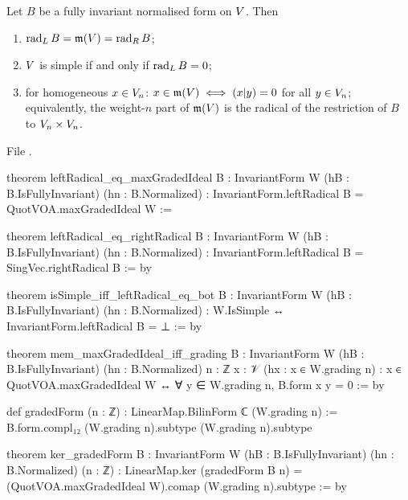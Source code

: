 \begin{theorem}[Li, Cor.~3.2]\label{l04:thm:lirad}
Let $B$ be a fully invariant normalised form on $V$. Then
\begin{enumerate}
\item $\operatorname{rad}_LB = \mathfrak{m}(V) = \operatorname{rad}_RB$;
\item $V$ is simple if and only if $\operatorname{rad}_LB = 0$;
\item for homogeneous $x\in V_n$: $x\in\mathfrak{m}(V)\iff(x|y) = 0$ for all $y\in V_n$; equivalently, the
weight-$n$ part of $\mathfrak{m}(V)$ is the radical of the restriction of $B$ to $V_n\times V_n$.
\end{enumerate}
\end{theorem}
\noindent File .
\begin{leancode}
theorem leftRadical_eq_maxGradedIdeal {B : InvariantForm W} (hB : B.IsFullyInvariant)
    (hn : B.Normalized) :
    InvariantForm.leftRadical B = QuotVOA.maxGradedIdeal W :=

theorem leftRadical_eq_rightRadical {B : InvariantForm W} (hB : B.IsFullyInvariant)
    (hn : B.Normalized) :
    InvariantForm.leftRadical B = SingVec.rightRadical B := by

theorem isSimple_iff_leftRadical_eq_bot {B : InvariantForm W} (hB : B.IsFullyInvariant)
    (hn : B.Normalized) :
    W.IsSimple ↔ InvariantForm.leftRadical B = ⊥ := by

theorem mem_maxGradedIdeal_iff_grading {B : InvariantForm W} (hB : B.IsFullyInvariant)
    (hn : B.Normalized) {n : ℤ} {x : 𝒱} (hx : x ∈ W.grading n) :
    x ∈ QuotVOA.maxGradedIdeal W ↔ ∀ y ∈ W.grading n, B.form x y = 0 := by

def gradedForm (n : ℤ) : LinearMap.BilinForm ℂ (W.grading n) :=
  B.form.compl₁₂ (W.grading n).subtype (W.grading n).subtype

theorem ker_gradedForm {B : InvariantForm W} (hB : B.IsFullyInvariant) (hn : B.Normalized)
    (n : ℤ) :
    LinearMap.ker (gradedForm B n) = (QuotVOA.maxGradedIdeal W).comap (W.grading n).subtype := by
\end{leancode}
